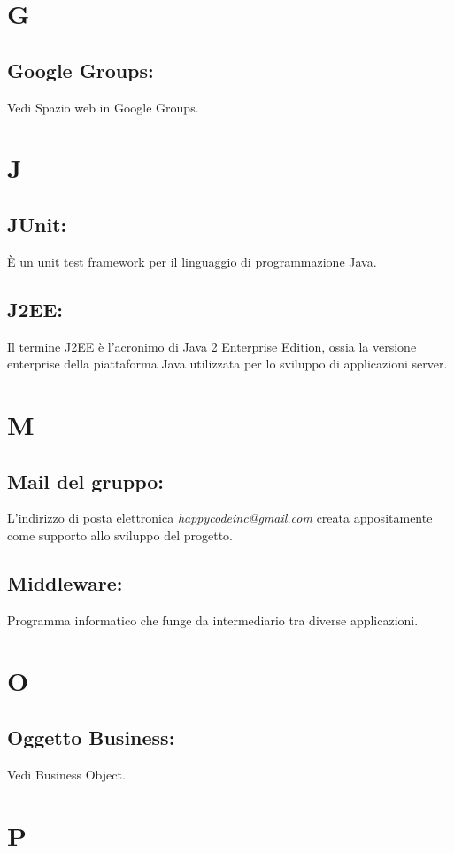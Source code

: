 \documentclass[11pt,titlepage,a4paper]{report}
\begin{document}
\chapter{G}
\section{Google Groups:}
Vedi Spazio web in Google Groups. 

\chapter{J}
\section{JUnit:}
\`E un unit test framework per il linguaggio di programmazione Java.
\section{J2EE:}
Il termine J2EE \`e l'acronimo di Java 2 Enterprise Edition, ossia la versione enterprise della piattaforma Java utilizzata per lo sviluppo di applicazioni server.

\chapter{M}
\section{Mail del gruppo:}
L'indirizzo di posta elettronica \textit{happycodeinc@gmail.com} creata appositamente come supporto allo sviluppo del progetto.
\section{Middleware:}
Programma informatico che funge da intermediario tra diverse applicazioni.

\chapter{O}
\section{Oggetto Business:}
Vedi Business Object.

\chapter{P}
\end{document}
